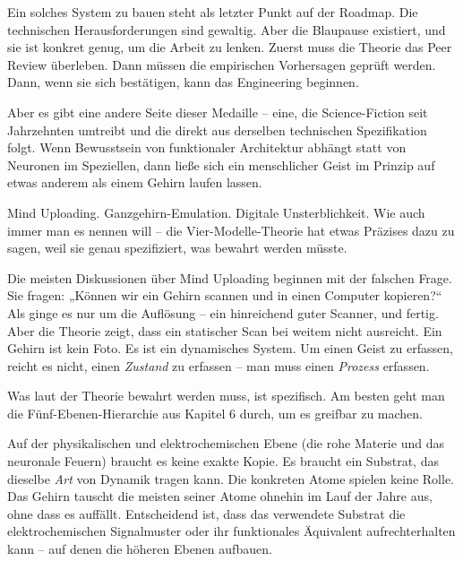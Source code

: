 \documentclass[11pt, twoside, openright]{book}
\begin{document}
Ein solches System zu bauen steht als letzter Punkt auf der Roadmap. Die technischen Herausforderungen sind gewaltig. Aber die Blaupause existiert, und sie ist konkret genug, um die Arbeit zu lenken. Zuerst muss die Theorie das Peer Review überleben. Dann müssen die empirischen Vorhersagen geprüft werden. Dann, wenn sie sich bestätigen, kann das Engineering beginnen.


Aber es gibt eine andere Seite dieser Medaille -- eine, die Science-Fiction seit Jahrzehnten umtreibt und die direkt aus derselben technischen Spezifikation folgt. Wenn Bewusstsein von funktionaler Architektur abhängt statt von Neuronen im Speziellen, dann ließe sich ein menschlicher Geist im Prinzip auf etwas anderem als einem Gehirn laufen lassen.

Mind Uploading. Ganzgehirn-Emulation. Digitale Unsterblichkeit. Wie auch immer man es nennen will -- die Vier-Modelle-Theorie hat etwas Präzises dazu zu sagen, weil sie genau spezifiziert, was bewahrt werden müsste.

Die meisten Diskussionen über Mind Uploading beginnen mit der falschen Frage. Sie fragen: „Können wir ein Gehirn scannen und in einen Computer kopieren?“ Als ginge es nur um die Auflösung -- ein hinreichend guter Scanner, und fertig. Aber die Theorie zeigt, dass ein statischer Scan bei weitem nicht ausreicht. Ein Gehirn ist kein Foto. Es ist ein dynamisches System. Um einen Geist zu erfassen, reicht es nicht, einen \textit{Zustand} zu erfassen -- man muss einen \textit{Prozess} erfassen.

Was laut der Theorie bewahrt werden muss, ist spezifisch. Am besten geht man die Fünf-Ebenen-Hierarchie aus Kapitel 6 durch, um es greifbar zu machen.

Auf der physikalischen und elektrochemischen Ebene (die rohe Materie und das neuronale Feuern) braucht es keine exakte Kopie. Es braucht ein Substrat, das dieselbe \textit{Art} von Dynamik tragen kann. Die konkreten Atome spielen keine Rolle. Das Gehirn tauscht die meisten seiner Atome ohnehin im Lauf der Jahre aus, ohne dass es auffällt. Entscheidend ist, dass das verwendete Substrat die elektrochemischen Signalmuster oder ihr funktionales Äquivalent aufrechterhalten kann -- auf denen die höheren Ebenen aufbauen.
\end{document}
